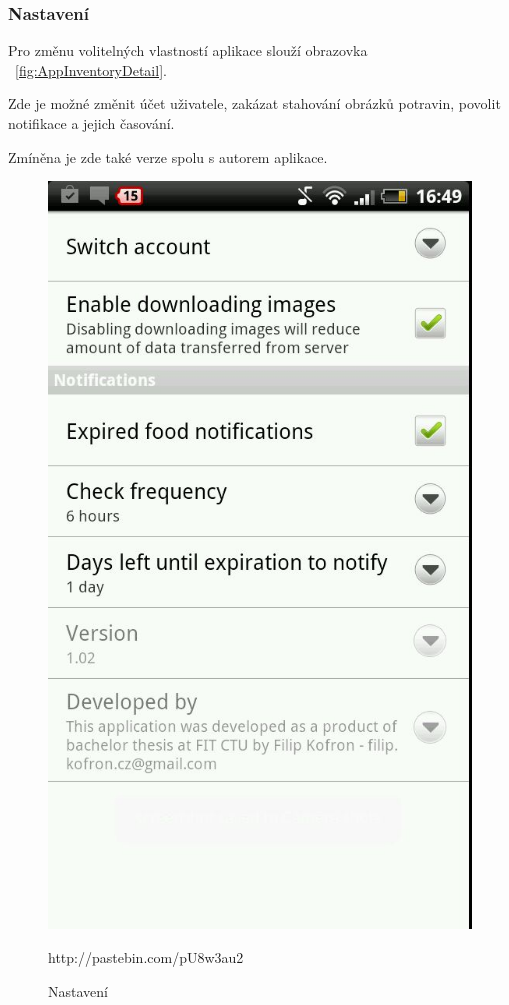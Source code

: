 \documentclass[thesis=B,czech]{FITthesis}[2013/10/20]
\begin{document}
\clearpage

\subsubsection{Nastavení}

Pro změnu volitelných vlastností aplikace slouží obrazovka ~\ref{fig:AppInventoryDetail}.

Zde je možné změnit účet uživatele, zakázat stahování obrázků potravin, povolit notifikace a jejich časování.

Zmíněna je zde také verze spolu s autorem aplikace.

\begin{figure}[H]
  \centering
  \includegraphics[scale=0.4]{screenshots/app_settings.jpg}
  \caption{Nastavení}
  \label{fig:AppSettings}http://pastebin.com/pU8w3au2
\end{figure}
\end{document}
